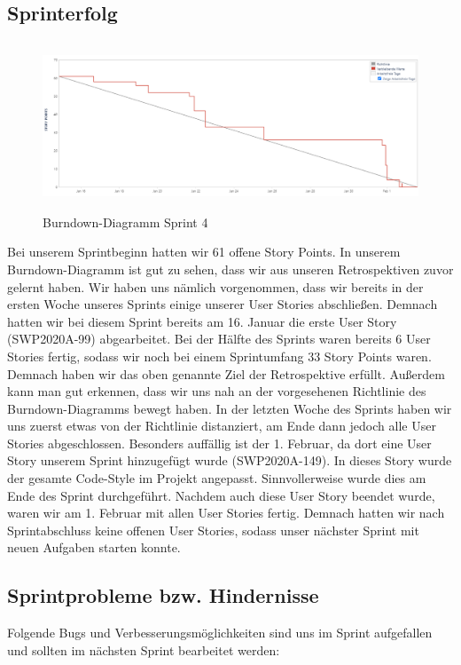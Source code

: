 \documentclass[12pt,a4paper, oneside]{article}
\begin{document}
    \subsection{Sprinterfolg}
    \begin{figure}[h]
        \centering
        \includegraphics[width=\textwidth, height=5cm]{../img/sprint_04/Burndown Sprint 4.png}
        \caption{Burndown-Diagramm Sprint 4}
        \label{fig: Burndown-Diagramm Sprint 4}
    \end{figure}
    Bei unserem Sprintbeginn hatten wir 61 offene Story Points. In unserem Burndown-Diagramm ist gut zu sehen, dass wir aus unseren Retrospektiven zuvor gelernt haben. Wir haben uns nämlich vorgenommen, dass wir bereits in der ersten Woche unseres Sprints einige unserer User Stories abschließen. Demnach hatten wir bei diesem Sprint bereits am 16. Januar die erste User Story (SWP2020A-99) abgearbeitet. Bei der Hälfte des Sprints waren bereits 6 User Stories fertig, sodass wir noch bei einem Sprintumfang 33 Story Points waren. Demnach haben wir das oben genannte Ziel der Retrospektive erfüllt. Außerdem kann man gut erkennen, dass wir uns nah an der vorgesehenen Richtlinie des Burndown-Diagramms bewegt haben. In der letzten Woche des Sprints haben wir uns zuerst etwas von der Richtlinie distanziert, am Ende dann jedoch alle User Stories abgeschlossen. Besonders auffällig ist der 1. Februar, da dort eine User Story unserem Sprint hinzugefügt wurde (SWP2020A-149). In dieses Story wurde der gesamte Code-Style im Projekt angepasst. Sinnvollerweise wurde dies am Ende des Sprint durchgeführt. Nachdem auch diese User Story beendet wurde, waren wir am 1. Februar mit allen User Stories fertig. Demnach hatten wir nach Sprintabschluss keine offenen User Stories, sodass unser nächster Sprint mit neuen Aufgaben starten konnte.

    \subsection{Sprintprobleme bzw. Hindernisse}
    Folgende Bugs und Verbesserungsmöglichkeiten sind uns im Sprint aufgefallen und sollten im nächsten Sprint bearbeitet werden:
\end{document}
